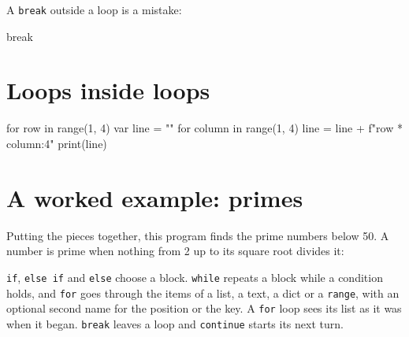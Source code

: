 
A \verb|break| outside a loop is a mistake:

\begin{zeno}[fails=yes]
break
\end{zeno}

\section{Loops inside loops}

\begin{zeno}
for row in range(1, 4) {
    var line = ""
    for column in range(1, 4) {
        line = line + f"{row * column:4}"
    }
    print(line)
}
\end{zeno}

\section{A worked example: primes}

Putting the pieces together, this program finds the prime numbers
below 50. A number is prime when nothing from 2 up to its square root
divides it:


\begin{summary}
\verb|if|, \verb|else if| and \verb|else| choose a block. \verb|while|
repeats a block while a condition holds, and \verb|for| goes through
the items of a list, a text, a dict or a \verb|range|, with an
optional second name for the position or the key. A \verb|for| loop
sees its list as it was when it began. \verb|break| leaves a loop and
\verb|continue| starts its next turn.
\end{summary}


